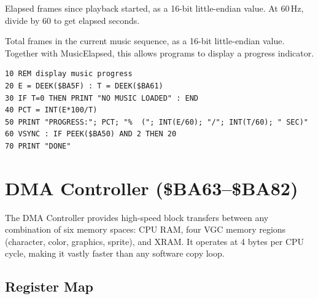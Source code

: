 Elapsed frames since playback started, as a 16-bit little-endian value.
At 60\,Hz, divide by 60 to get elapsed seconds.



Total frames in the current music sequence, as a 16-bit little-endian
value.  Together with MusicElapsed, this allows programs to display a
progress indicator.

\begin{lstlisting}
10 REM display music progress
20 E = DEEK($BA5F) : T = DEEK($BA61)
30 IF T=0 THEN PRINT "NO MUSIC LOADED" : END
40 PCT = INT(E*100/T)
50 PRINT "PROGRESS:"; PCT; "%  ("; INT(E/60); "/"; INT(T/60); " SEC)"
60 VSYNC : IF PEEK($BA50) AND 2 THEN 20
70 PRINT "DONE"
\end{lstlisting}


\section{DMA Controller (\$BA63--\$BA82)}
\label{sec:dma}

The DMA Controller provides high-speed block transfers between any
combination of six memory spaces: CPU RAM, four VGC memory regions
(character, color, graphics, sprite), and XRAM.  It operates at 4 bytes
per CPU cycle, making it vastly faster than any software copy loop.

\subsection{Register Map}


